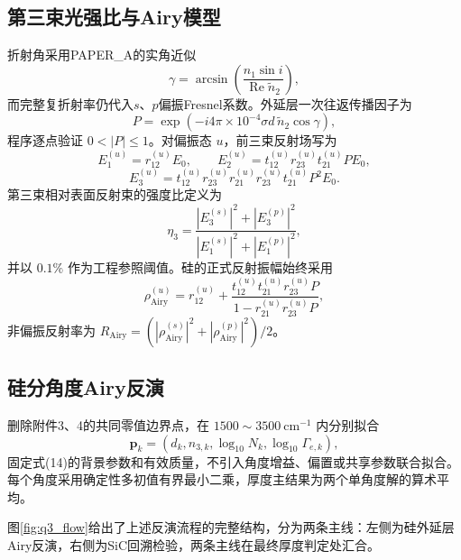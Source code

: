 \documentclass[UTF8,fontset=fandol,12pt,a4paper]{ctexart}
\begin{document}
	\subsection{第三束光强比与Airy模型}
	
	折射角采用PAPER\_A的实角近似
	\begin{equation}
		\gamma = \arcsin\left(\frac{n_1\sin i}{\operatorname{Re}\widetilde n_2}\right),
	\end{equation}
	而完整复折射率仍代入$s$、$p$偏振Fresnel系数。外延层一次往返传播因子为
	\begin{equation}
		P = \exp\left(-i4\pi\times10^{-4}\sigma d\,\widetilde n_2\cos\gamma\right),
	\end{equation}
	程序逐点验证 $0<|P|\le1$。对偏振态 $u$，前三束反射场写为
	\begin{equation}
		E_1^{(u)} = r_{12}^{(u)}E_0,\qquad
		E_2^{(u)} = t_{12}^{(u)}r_{23}^{(u)}t_{21}^{(u)}P E_0,
	\end{equation}
	\begin{equation}
		E_3^{(u)} = t_{12}^{(u)}r_{23}^{(u)}r_{21}^{(u)}r_{23}^{(u)}t_{21}^{(u)}P^2 E_0.
	\end{equation}
	第三束相对表面反射束的强度比定义为
	\begin{equation}
		\eta_3 = \frac{|E_3^{(s)}|^2 + |E_3^{(p)}|^2}{|E_1^{(s)}|^2 + |E_1^{(p)}|^2},
	\end{equation}
	并以 $0.1\%$ 作为工程参照阈值。硅的正式反射振幅始终采用
	\begin{equation}
		\rho_{\mathrm{Airy}}^{(u)} = r_{12}^{(u)} + \frac{t_{12}^{(u)}t_{21}^{(u)}r_{23}^{(u)}P}{1 - r_{21}^{(u)}r_{23}^{(u)}P},
	\end{equation}
	非偏振反射率为 $R_{\mathrm{Airy}} = (|\rho_{\mathrm{Airy}}^{(s)}|^2 + |\rho_{\mathrm{Airy}}^{(p)}|^2)/2$。
	
	\subsection{硅分角度Airy反演}
	
	删除附件3、4的共同零值边界点，在 $1500\sim3500\ \mathrm{cm^{-1}}$ 内分别拟合
	\begin{equation}
		\mathbf{p}_k = (d_k, n_{3,k}, \log_{10}N_k, \log_{10}\Gamma_{e,k}),
	\end{equation}
	固定式(14)的背景参数和有效质量，不引入角度增益、偏置或共享参数联合拟合。每个角度采用确定性多初值有界最小二乘，厚度主结果为两个单角度解的算术平均。
	
	图\ref{fig:q3_flow}给出了上述反演流程的完整结构，分为两条主线：左侧为硅外延层Airy反演，右侧为SiC回溯检验，两条主线在最终厚度判定处汇合。
	
\end{document}

